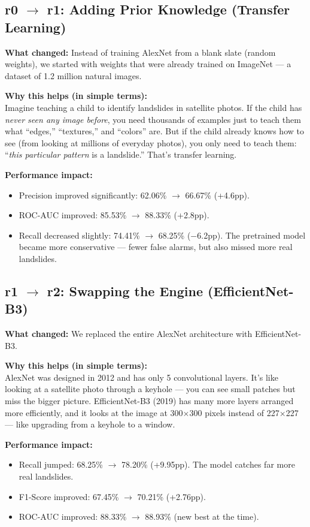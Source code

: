 \documentclass[11pt]{article}
\begin{document}
\subsection{r0 $\to$ r1: Adding Prior Knowledge (Transfer Learning)}

\textbf{What changed:} Instead of training AlexNet from a blank slate (random weights), we started with weights that were already trained on ImageNet --- a dataset of 1.2 million natural images.

\textbf{Why this helps (in simple terms):}\\
Imagine teaching a child to identify landslides in satellite photos. If the child has \emph{never seen any image before}, you need thousands of examples just to teach them what ``edges,'' ``textures,'' and ``colors'' are. But if the child already knows how to see (from looking at millions of everyday photos), you only need to teach them: ``\emph{this particular pattern} is a landslide.'' That's transfer learning.

\textbf{Performance impact:}
\begin{itemize}[nosep]
    \item Precision improved significantly: 62.06\% $\to$ 66.67\% (+4.6pp).
    \item ROC-AUC improved: 85.53\% $\to$ 88.33\% (+2.8pp).
    \item Recall decreased slightly: 74.41\% $\to$ 68.25\% ($-$6.2pp). The pretrained model became more conservative --- fewer false alarms, but also missed more real landslides.
\end{itemize}

\subsection{r1 $\to$ r2: Swapping the Engine (EfficientNet-B3)}

\textbf{What changed:} We replaced the entire AlexNet architecture with EfficientNet-B3.

\textbf{Why this helps (in simple terms):}\\
AlexNet was designed in 2012 and has only 5 convolutional layers. It's like looking at a satellite photo through a keyhole --- you can see small patches but miss the bigger picture. EfficientNet-B3 (2019) has many more layers arranged more efficiently, and it looks at the image at 300$\times$300 pixels instead of 227$\times$227 --- like upgrading from a keyhole to a window.

\textbf{Performance impact:}
\begin{itemize}[nosep]
    \item Recall jumped: 68.25\% $\to$ 78.20\% (+9.95pp). The model catches far more real landslides.
    \item F1-Score improved: 67.45\% $\to$ 70.21\% (+2.76pp).
    \item ROC-AUC improved: 88.33\% $\to$ 88.93\% (new best at the time).
\end{itemize}
\end{document}
